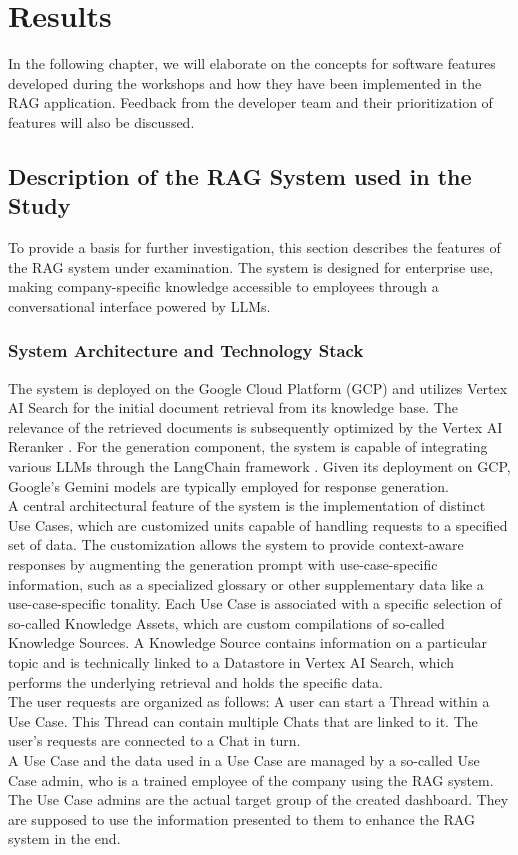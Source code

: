 \documentclass[
	english,
	ruledheaders=section,%
	class=report,%
	thesis={type=bachelor},%
	accentcolor=1b,%
	custommargins=true,%
	marginpar=false,%
	parskip=half-,%
	fontsize=11pt,%
	DIV=14,
]{tudapub}
\begin{document}
\chapter{Results}
In the following chapter, we will elaborate on the concepts for software features developed during the workshops and how they have been implemented in the RAG application. Feedback from the developer team and their prioritization of features will also be discussed.
\section{Description of the RAG System used in the Study}
To provide a basis for further investigation, this section describes the features of the RAG system under examination. The system is designed for enterprise use, making company-specific knowledge accessible to employees through a conversational interface powered by LLMs.
\subsection{System Architecture and Technology Stack}
The system is deployed on the Google Cloud Platform (GCP) \parencite{GoogleCloudDocumentation} and utilizes Vertex AI Search \parencite{GoogleVertexAISearch} for the initial document retrieval from its knowledge base. The relevance of the retrieved documents is subsequently optimized by the Vertex AI Reranker \parencite{GoogleReranker}. For the generation component, the system is capable of integrating various LLMs through the LangChain framework \parencite{LangChain}. Given its deployment on GCP, Google's Gemini models \parencite{GoogleGemini} are typically employed for response generation.\\
A central architectural feature of the system is the implementation of distinct Use Cases, which are customized units capable of handling requests to a specified set of data. The customization allows the system to provide context-aware responses by augmenting the generation prompt with use-case-specific information, such as a specialized glossary or other supplementary data like a use-case-specific tonality. Each Use Case is associated with a specific selection of so-called Knowledge Assets, which are custom compilations of so-called Knowledge Sources. A Knowledge Source contains information on a particular topic and is technically linked to a Datastore in Vertex AI Search, which performs the underlying retrieval and holds the specific data.\\
The user requests are organized as follows: A user can start a Thread within a Use Case. This Thread can contain multiple Chats that are linked to it. The user's requests are connected to a Chat in turn.\\
A Use Case and the data used in a Use Case are managed by a so-called Use Case admin, who is a trained employee of the company using the RAG system. The Use Case admins are the actual target group of the created dashboard. They are supposed to use the information presented to them to enhance the RAG system in the end.
\end{document}
